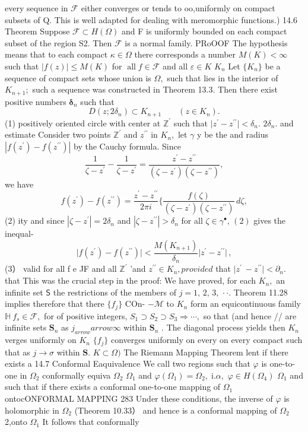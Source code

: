 every sequence in $\mathcal{F}$ either converges or tends to oo,uniformly on compact subsets of Q. This is well adapted for dealing with meromorphic functions.) 14.6 Theorem Suppose ${\mathcal{F}}\subset H(\Omega)$ and F is uniformly bounded on each compact subset of the region S2. Then ${\mathcal{F}}$ is a normal family. PRoOOF The hypothesis means that to each compact $\kappa\in\Omega$ there corresponds a number $M(K)<\infty$ such that $|f(z)|\leq M(K)$ for $\operatorname{all}f\in{\mathcal{F}}$ and all $\scriptstyle{\varepsilon\in K}$ $K_{n}$ Let $\{K_{n}\}$ be a sequence of compact sets whose union is $\Omega,$ such that lies in the interior of $K_{n+1};$ such a sequence was constructed in Theorem 13.3. Then there exist positive numbers ${\boldsymbol{\delta}}_{n}$ such that $$ D(z;2\delta_{n})\subset K_{n+1}\qquad(z\in K_{n}). $$ (1) positively oriented circle with center at $\mathbb{Z}^{\prime}$ such that $\mid z^{\prime}-z^{\prime\prime}\mid<\delta_{n}.$ $2\delta_{n}.$ and estimate Consider two points $\mathbb{Z}^{\prime}$ and $z^{\prime\prime}$ in $K_{n},$ let $\scriptstyle\gamma$ y be the and radius $|f(z^{\prime})-f(z^{\prime\prime})|$ by the Cauchy formula. Since $$ {\frac{1}{\zeta-z^{\prime}}}-{\frac{1}{\zeta-z^{\prime}}}={\frac{z^{\prime}-z^{\prime\prime}}{(\zeta-z^{\prime})(\zeta-z^{\prime\prime})}}, $$ we have $$ f(z^{\prime})-f(z^{\prime\prime})=\frac{z^{\prime}-z^{\prime\prime}}{2\pi i} \{\frac{f(\zeta)}{(\zeta-z^{\prime})(\zeta-z^{\prime\prime})}\,d\zeta, $$ (2) ity and since $|\zeta-z^{\prime}|=2\delta_{n}$ and $|\zeta-z^{\prime\prime}|>\delta_{n}$ for all $\zeta\in\gamma^{\bullet},\,(2)$ gives the inequal- $$ \vert f(z^{\prime})-f(z^{\prime\prime})\vert<\frac{M(K_{n+1})}{\delta_{n}}\vert z^{\prime}-z^{\prime\prime}\vert\,, $$ (3） valid for all f e JF and all $\mathbb{Z}^{\prime}$ ’and $z^{\prime\prime}\in K_{n},p r o v i d e d$ that $\mid z^{\prime}\ -z^{\prime\prime}\mid<\partial_{n}.$ that This was the crucial step in the proof: We have proved, for each $K_{n},$ an infinite set $\boldsymbol{\mathsf{S}}$ the restrictions of the members of $j=1,\,2,\,3,\,\cdot\cdot.$ Theorem 11.28 implies therefore that there $\{f_{j}\}$ COn- $-{\mathcal{M}}$ to $K_{n}$ form an equicontinuous family $\mathbb{H}\ f_{s}\in{\mathcal{F}},$ for of positive integers, $S_{1}\supset S_{2}\supset S_{3}\Rightarrow\cdots,$ so that (and hence // are infinite sets ${\boldsymbol{S}}_{n}$ as $j_{ arrow} arrow\infty$ within ${\boldsymbol{S}}_{n}$ . The diagonal process yields then $K_{n}$ verges uniformly on $K_{n}$ $\{f_{j}\}$ converges uniformly on every on every compact such that as $j\to\sigma$ within ${\boldsymbol{S}}.$ $K\subset\Omega)$ The Riemann Mapping Theorem lent if there exists a 14.7 Conformal Eaquivalence We call two regions such that $\varphi$ is one-to-one in $\Omega_{2}$ conformally equiva $\Omega_{2}$ $\Omega_{1}$ and $\varphi(\Omega_{1})=\Omega_{2},\;\mathrm{i}.\alpha,$ $\varphi\in H(\Omega_{4})$ $\Omega_{1}$ and such that if there exists a conformal one-to-one mapping of $\Omega_{1}$ ontocONFORMAL MAPPING 283 Under these conditions, the inverse of $\varphi$ is holomorphic in $\Omega_{2}$ (Theorem 10.33） and hence is a conformal mapping of $\Omega_{2}$ 2,onto $\Omega_{1}$ It follows that conformally 